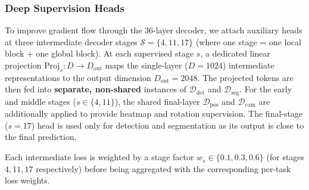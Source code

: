 \subsubsection{Deep Supervision Heads}
\label{sec:supp_deep}

To improve gradient flow through the 36-layer decoder, we attach
auxiliary heads at three intermediate decoder stages
$\mathcal{S}\!=\!\{4,11,17\}$ (where one stage = one local block +
one global block). At each supervised stage $s$, a dedicated linear
projection $\text{Proj}_s: D\!\to\!D_\text{out}$ maps the single-layer
($D{=}1024$) intermediate representations to the output dimension
$D_\text{out}{=}2048$. The projected tokens are then fed into
\textbf{separate, non-shared} instances of $\mathcal{D}_\text{det}$
and $\mathcal{D}_\text{seg}$. For the early and middle stages ($s{\in}\{4,11\}$), the shared final-layer $\mathcal{D}_\text{pos}$
and $\mathcal{D}_\text{cam}$ are additionally applied to provide
heatmap and rotation supervision. The final-stage ($s{=}17$) head is used only for detection and segmentation as its output is close to the
final prediction.

Each intermediate loss is weighted by a stage factor
$w_s\in\{0.1, 0.3, 0.6\}$ (for stages $4, 11, 17$ respectively)
before being aggregated with the corresponding per-task loss weights.

